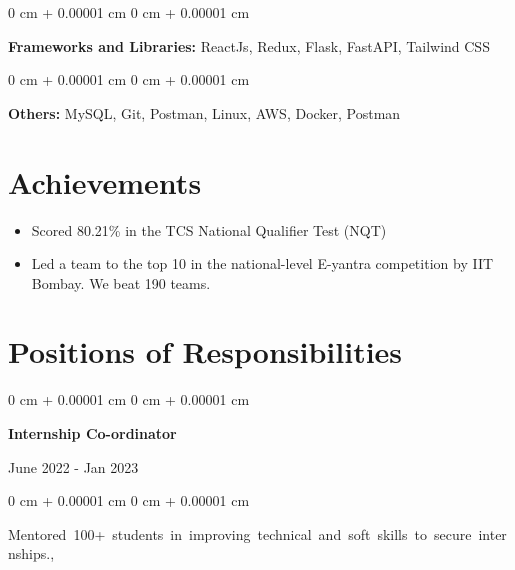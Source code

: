 \documentclass[10pt, letterpaper]{article}
\newenvironment{highlightsforbulletentries}{
    \begin{itemize}[
        topsep=0.10 cm,
        parsep=0.10 cm,
        partopsep=0pt,
        itemsep=0pt,
        leftmargin=10pt
    ]
}{
    \end{itemize}
} %
\newenvironment{onecolentry}{
    \begin{adjustwidth}{
        0 cm + 0.00001 cm
    }{
        0 cm + 0.00001 cm
    }
}{
    \end{adjustwidth}
} %
\newenvironment{twocolentry}[2][]{
    \onecolentry
    \def\secondColumn{#2}
    \setcolumnwidth{\fill, 4.5 cm}
    \begin{paracol}{2}
}{
    \switchcolumn \raggedleft \secondColumn
    \end{paracol}
    \endonecolentry
} %
\begin{document}
        \vspace{0.2 cm}

        \begin{onecolentry}
            \textbf{Frameworks and Libraries:} ReactJs, Redux, Flask, FastAPI, Tailwind CSS
        \end{onecolentry}

        \vspace{0.2 cm}

        \begin{onecolentry}
            \textbf{Others:} MySQL, Git, Postman, Linux, AWS, Docker, Postman
        \end{onecolentry}

        \vspace{0.2 cm}

    
    \section{Achievements}
  
        \begin{highlightsforbulletentries}
            \item Scored 80.21\% in the TCS National Qualifier Test (NQT)
            \item Led a team to the top 10 in the national-level E-yantra competition by IIT Bombay. We beat 190 teams.
        \end{highlightsforbulletentries}

    

    \section{Positions of Responsibilities}

        
        \begin{samepage}
            \begin{twocolentry}{
                June 2022 - Jan 2023
            }
                \textbf{Internship Co-ordinator}
            \end{twocolentry}

            \vspace{0.10 cm}
            
            \begin{onecolentry}
                \mbox{Mentored 100+ students in improving technical and soft skills to secure internships.}, 
                \vspace{0.10 cm}
                
        \end{onecolentry}
        \end{samepage}

    
\end{document}
